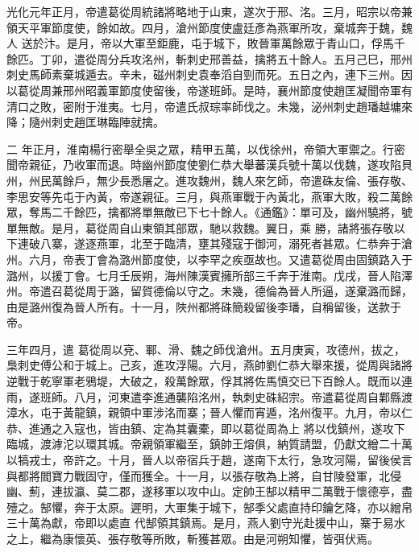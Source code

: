 
\begin{pinyinscope}

 光化元年正月，帝遣葛從周統諸將略地于山東，遂次于邢、洺。三月，昭宗以帝兼領天平軍節度使，餘如故。四月，滄州節度使盧廷彥為燕軍所攻，棄城奔于魏，魏人
 送於汴。是月，帝以大軍至鉅鹿，屯于城下，敗晉軍萬餘眾于青山口，俘馬千餘匹。丁卯，遣從周分兵攻洺州，斬刺史邢善益，擒將五十餘人。五月己巳，邢州刺史馬師素棄城遁去。辛未，磁州刺史袁奉滔自剄而死。五日之內，連下三州。因以葛從周兼邢州昭義軍節度使留後，帝遂班師。是時，襄州節度使趙匡凝聞帝軍有清口之敗，密附于淮夷。七月，帝遣氏叔琮率師伐之。未幾，泌州刺史趙璠越墉來降；隨州刺史趙匡琳臨陣就擒。



 二
 年正月，淮南楊行密舉全吳之眾，精甲五萬，以伐徐州，帝領大軍禦之。行密聞帝親征，乃收軍而退。時幽州節度使劉仁恭大舉蕃漢兵號十萬以伐魏，遂攻陷貝州，州民萬餘戶，無少長悉屠之。進攻魏州，魏人來乞師，帝遣硃友倫、張存敬、李思安等先屯于內黃，帝遂親征。三月，與燕軍戰于內黃北，燕軍大敗，殺二萬餘眾，奪馬二千餘匹，擒都將單無敵已下七十餘人。《通鑑》：單可及，幽州驍將，號單無敵。是月，葛從周自山東領其部眾，馳以救魏。翼日，乘
 勝，諸將張存敬以下連破八寨，遂逐燕軍，北至于臨清，壅其殘寇于御河，溺死者甚眾。仁恭奔于滄州。六月，帝表丁會為潞州節度使，以李罕之疾亟故也。又遣葛從周由固鎮路入于潞州，以援丁會。七月壬辰朔，海州陳漢賓擁所部三千奔于淮南。戊戌，晉人陷澤州。帝遣召葛從周于潞，留賀德倫以守之。未幾，德倫為晉人所逼，遂棄潞而歸，由是潞州復為晉人所有。十一月，陜州都將硃簡殺留後李璠，自稱留後，送款于帝。



 三年四月，遣
 葛從周以兗、鄆、滑、魏之師伐滄州。五月庚寅，攻德州，拔之，梟刺史傅公和于城上。己亥，進攻浮陽。六月，燕帥劉仁恭大舉來援，從周與諸將逆戰于乾寧軍老鴉堤，大破之，殺萬餘眾，俘其將佐馬慎交已下百餘人。既而以連雨，遂班師。八月，河東遣李進通襲陷洺州，執刺史硃紹宗。帝遣葛從周自鄴縣渡漳水，屯于黃龍鎮，親領中軍涉洺而寨；晉人懼而宵遁，洺州復平。九月，帝以仁恭、進通之入寇也，皆由鎮、定為其囊橐，即以葛從周為上
 將以伐鎮州，遂攻下臨城，渡滹沱以環其城。帝親領軍繼至，鎮帥王熔俱，納質請盟，仍獻文繒二十萬以犒戎士，帝許之。十月，晉人以帝宿兵于趙，遂南下太行，急攻河陽，留後侯言與都將閻寶力戰固守，僅而獲全。十一月，以張存敬為上將，自甘陵發軍，北侵幽、薊，連拔瀛、莫二郡，遂移軍以攻中山。定帥王郜以精甲二萬戰于懷德亭，盡殪之。郜懼，奔于太原。遲明，大軍集于城下，郜季父處直持印鑰乞降，亦以繒帛三十萬為獻，帝即以處直
 代郜領其鎮焉。是月，燕人劉守光赴援中山，寨于易水之上，繼為康懷英、張存敬等所敗，斬獲甚眾。由是河朔知懼，皆弭伏焉。




\end{pinyinscope}
